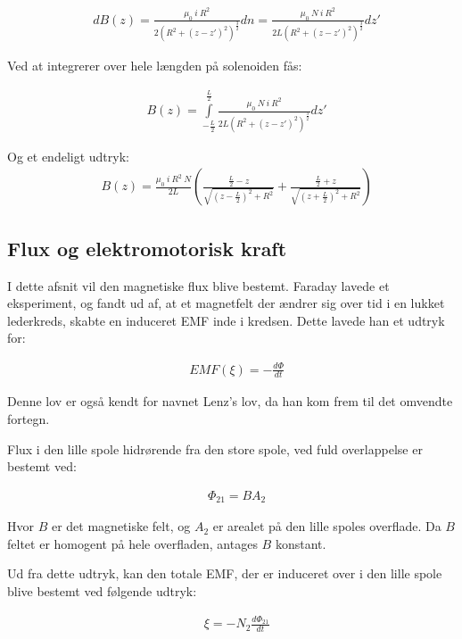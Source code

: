 \begin{align}
	&dB(z)=\frac{\mu_0 \: i \: R^2}{2(R^2+(z-z')^2)^\frac{3}{2}}dn=\frac{\mu_0 \: N \: i \: R^2}{2L(R^2+(z-z')^2)^\frac{3}{2}}dz'
\end{align}

Ved at integrerer over hele længden på solenoiden fås:

\begin{align}
	&B(z)=\int\limits_{-\frac{L}{2}}^{\frac{L}{2}}\frac{\mu_0 \: N \: i \: R^2}{2L(R^2+(z-z')^2)^\frac{3}{2}}dz'
\end{align}

Og et endeligt udtryk:
\begin{align}
	&B(z)= \frac{\mu_0 \: i \: R^2 \: N}{2L}\left(\frac{\frac{L}{2}-z}{\sqrt{(z-\frac{L}{2})^2+R^2}}+\frac{\frac{L}{2}+z}{\sqrt{(z+\frac{L}{2})^2+R^2}}\right)
\end{align}

\subsection{Flux og elektromotorisk kraft}
I dette afsnit vil den magnetiske flux blive bestemt.  
Faraday lavede et eksperiment, og fandt ud af, at et magnetfelt der ændrer sig over tid i en lukket lederkreds, skabte en induceret EMF inde i kredsen.
Dette lavede han et udtryk for:

\begin{align}
	&EMF(\xi) = - \frac{d\Phi}{dt}
\end{align}

Denne lov er også kendt for navnet Lenz's lov, da han kom frem til det omvendte fortegn.

Flux i den lille spole hidrørende fra den store spole, ved fuld overlappelse er bestemt ved:

\begin{align}
	&\Phi_{21} = BA_2
\end{align}

Hvor $B$ er det magnetiske felt, og $A_2$ er arealet på den lille spoles overflade.
Da $B$ feltet er homogent på hele overfladen, antages $B$ konstant. 

Ud fra dette udtryk, kan den totale EMF, der er induceret over i den lille spole blive bestemt ved følgende udtryk:

\begin{align}
	&\xi = -N_2\frac{d\Phi_{21}}{dt} \label{eq:emf_lille_spole}
\end{align}

